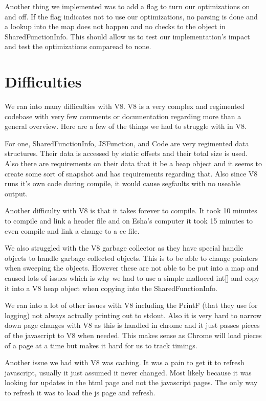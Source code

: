 \documentclass[twocolumn,showpacs,%
  nofootinbib,aps,superscriptaddress,%
  eqsecnum,prd,notitlepage,showkeys,10pt]{revtex4-1}
\begin{document}
Another thing we implemented was to add a flag to turn our optimizations on and off. If the flag indicates not to use our optimizations, no parsing is done and a lookup into the map does not happen and no checks to the object in SharedFunctionInfo. This should allow us to test our implementation's impact and test the optimizations comparead to none.

\section {Difficulties}
We ran into many difficulties with V8. V8 is a very complex and regimented codebase with very few comments or documentation regarding more than a general overview. Here are a few of the things we had to struggle with in V8.

For one, SharedFunctionInfo, JSFunction, and Code are very regimented data structures. Their data is  accessed by static offsets and their total size is used. Also there are requirements on their data that it be a heap object and it seems to create some sort of snapshot and has requirements regarding that. Also since V8 runs it's own code during compile, it would cause segfaults with no useable output.

Another difficulty with V8 is that it takes forever to compile. It took 10 minutes to compile and link a header file and on Esha's computer it took 15 minutes to even compile and link a change to a cc file.

We also struggled with the V8 garbage collector as they have special handle objects to handle garbage collected objects. This is to be able to change pointers when sweeping the objects. However these are not able to be put into a map and caused lots of issues which is why we had to use a simple malloced int[] and copy it into a V8 heap object when copying into the SharedFunctionInfo. 

We ran into a lot of other issues with V8 including the PrintF (that they use for logging) not always actually printing out to stdout. Also it is very hard to narrow down page changes with V8 as this is handled in chrome and it just passes pieces of the javascript to V8 when needed. This makes sense as Chrome will load pieces of a page at a time but makes it hard for us to track timings.

Another issue we had with V8 was caching. It was a pain to get it to refresh javascript, usually it just assumed it never changed. Most likely because it was looking for updates in the html page and not the javascript pages. The only way to refresh it was to load the js page and refresh.
\end{document}
